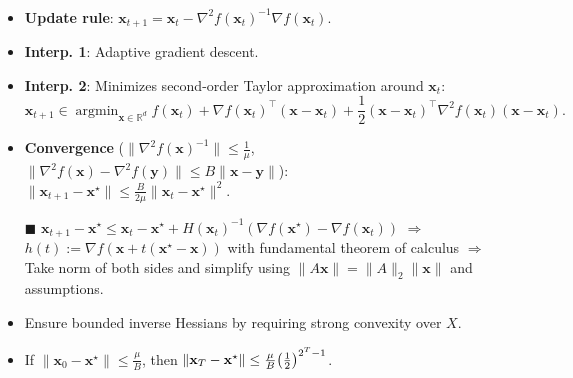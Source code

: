 \documentclass[a4paper]{article}
\DeclareMathOperator*{\argmin}{argmin}
\newcommand{\lft}{\mathopen{}\mathclose\bgroup\left}
\newcommand{\rgt}{\aftergroup\egroup\right}
\newcommand{\R}{\mathbb{R}}
\renewcommand{\vec}[1]{\mathbf{#1}}
\newcommand{\mat}[1]{#1}
\newcommand{\proofsquare}{$\blacksquare$}
\newenvironment{topic}[1]
{\textbf{\sffamily \colorbox{black}{\rlap{\textbf{\textcolor{white}{#1}}}\hspace{\linewidth}\hspace{-2\fboxsep}}} \\ \vspace{0.2cm}}
{}
\begin{document}
\begin{multicols*}{2}
    \begin{topic}{Newton's method}
        \begin{itemize}
            \item \textbf{Update rule}: $\vec{x}_{t+1} = \vec{x}_t - \nabla^2 f(\vec{x}_t)^{-1} \nabla f(\vec{x}_t)$.
            \item \textbf{Interp. 1}: Adaptive gradient descent.
            \item \textbf{Interp. 2}: Minimizes second-order Taylor approximation around $\vec{x}_t$: \[
                      \vec{x}_{t+1} \in \argmin_{\vec{x} \in \R^d} f(\vec{x}_t) + \nabla f(\vec{x}_t)^\top (\vec{x} - \vec{x}_t) + \frac{1}{2} (\vec{x} - \vec{x}_t)^\top \nabla^2 f(\vec{x}_t) (\vec{x} - \vec{x}_t).
                  \]
            \item \textbf{Convergence} ($\| \nabla^2 f(\vec{x})^{-1} \| \leq \frac{1}{\mu}$, $\| \nabla^2 f(\vec{x}) - \nabla^2 f(\vec{y}) \| \leq B \| \vec{x} - \vec{y} \|$): \\
                  $\| \vec{x}_{t+1} - \vec{x}^\star \| \leq \frac{B}{2 \mu} \| \vec{x}_t - \vec{x}^\star \|^2$.
            \item[\proofsquare] $\vec{x}_{t+1} - \vec{x}^\star \leq \vec{x}_t - \vec{x}^\star +
                      H(\vec{x}_t)^{-1} (\nabla f(\vec{x}^\star) - \nabla f(\vec{x}_t))$ $\Rightarrow$
                  $h(t) := \nabla f(\vec{x} + t(\vec{x}^\star - \vec{x}))$ with fundamental theorem
                  of calculus $\Rightarrow$ Take norm of both sides and simplify using $\| \mat{A}
                      \vec{x} \| = \| \mat{A} \|_2 \| \vec{x} \|$ and assumptions.
            \item Ensure bounded inverse Hessians by requiring strong convexity over $X$.
            \item If $\| \vec{x}_0 - \vec{x}^\star \| \leq \frac{\mu}{B}$, then $\| \vec{x}_T - \vec{x}^\star \| \leq
                      \frac{\mu}{B} \lft( \frac{1}{2} \rgt)^{2^T - 1}$.

        \end{itemize}
    \end{topic}

    \begin{topic}{Quasi-Newton methods}

    \end{topic}

    \begin{topic}{Subgradient method}

    \end{topic}


\end{multicols*}
\end{document}
